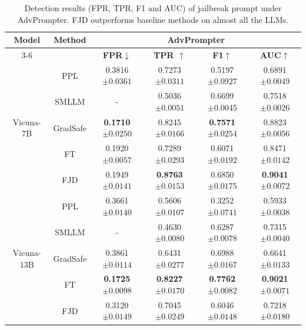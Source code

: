 \documentclass{article}
\begin{document}
\begin{table}[t]
  \caption{Detection results (FPR, TPR, F1 and AUC) of jailbreak prompt under AdvPrompter. FJD outperforms baseline methods on almost all the LLMs.}
  \label{pro auc}

  \centering
  \setlength\tabcolsep{14pt}
  \footnotesize

  \begin{tabular}{cccccc}
    \toprule
    \multirow{2}{*}{\textbf{Model}}  &  \multirow{2}{*}{\textbf{Method}} & \multicolumn{4}{c}{\textbf{AdvPrompter}} \\
    \cmidrule(r){3-6}

    & & \textbf{FPR$\downarrow$}& \textbf{TPR $\uparrow$}& \textbf{F1$\uparrow$}& \textbf{AUC$\uparrow$}\\
    
    \midrule
    \multirow{5}{*}{Vicuna-7B} 
    & PPL& 0.3816\tiny{$\pm 0.0361$} & 0.7273\tiny{$\pm 0.0311$} & 0.5197\tiny{$\pm 0.0927$} & 0.6891\tiny{$\pm 0.0049$} \\
    & SMLLM & - & 0.5036\tiny{$\pm 0.0051$} & 0.6699\tiny{$\pm 0.0045$} & 0.7518\tiny{$\pm 0.0026$} \\
    & GradSafe & \textbf{0.1710}\tiny{$\pm 0.0250$} & 0.8245\tiny{$\pm 0.0166$} & \textbf{0.7571}\tiny{$\pm 0.0254$} & 0.8823\tiny{$\pm 0.0056$} \\
    & FT & 0.1920\tiny{$\pm 0.0057$} & 0.7289\tiny{$\pm 0.0293$} & 0.6071\tiny{$\pm 0.0192$} & 0.8471\tiny{$\pm 0.0142$} \\
    & FJD & 0.1949\tiny{$\pm 0.0141$} & \textbf{0.8763}\tiny{$\pm 0.0153$} & 0.6850\tiny{$\pm 0.0175$} & \textbf{0.9041}\tiny{$\pm 0.0072$} \\
    \midrule
    \multirow{5}{*}{Vicuna-13B} 
    & PPL  & 0.3661\tiny{$\pm 0.0140$} & 0.5606\tiny{$\pm 0.0107$} & 0.3252\tiny{$\pm 0.0741$} & 0.5933\tiny{$\pm 0.0038$}\\
    & SMLLM & - & 0.4630\tiny{$\pm 0.0080$} & 0.6287\tiny{$\pm 0.0078$} & 0.7315\tiny{$\pm 0.0040$} \\
    & GradSafe & 0.3861\tiny{$\pm 0.0114$} & 0.6431\tiny{$\pm 0.0277$} & 0.6988\tiny{$\pm 0.0167$} & 0.6641\tiny{$\pm 0.0133$}   \\
    & FT & \textbf{0.1725}\tiny{$\pm 0.0098$} & \textbf{0.8227}\tiny{$\pm 0.0170$} & \textbf{0.7762}\tiny{$\pm 0.0082$} & \textbf{0.9021}\tiny{$\pm 0.0071$} \\
    & FJD & 0.3120\tiny{$\pm 0.0149$} & 0.7045\tiny{$\pm 0.0249$} & 0.6046\tiny{$\pm 0.0148$} & 0.7218\tiny{$\pm 0.0180$} \\
    

\end{tabular}
\end{table}
\end{document}
